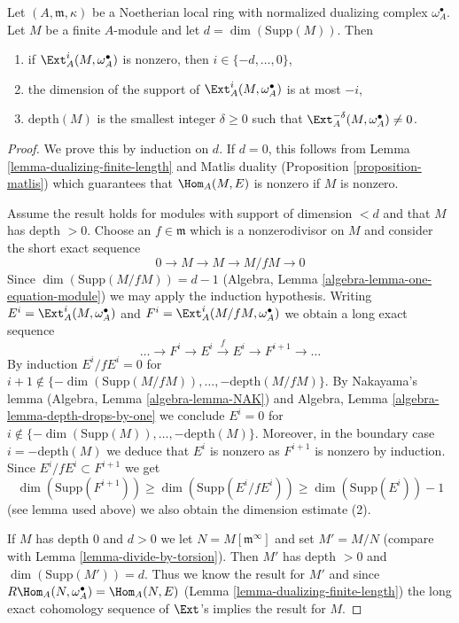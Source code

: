\begin{lemma}
\label{lemma-sitting-in-degrees}
Let $(A, \mathfrak m, \kappa)$ be a Noetherian local ring with
normalized dualizing complex $\omega_A^\bullet$. Let $M$ be a finite
$A$-module and let $d = \dim(\text{Supp}(M))$. Then
\begin{enumerate}
\item if $\Ext^i_A(M, \omega_A^\bullet)$ is nonzero, then
$i \in \{-d, \ldots, 0\}$,
\item the dimension of the support of $\Ext^i_A(M, \omega_A^\bullet)$
is at most $-i$,
\item $\text{depth}(M)$ is the smallest integer $\delta \geq 0$ such that
$\Ext^{-\delta}_A(M, \omega_A^\bullet) \not = 0$.
\end{enumerate}
\end{lemma}

\begin{proof}
We prove this by induction on $d$. If $d = 0$, this follows from
Lemma \ref{lemma-dualizing-finite-length} and Matlis duality
(Proposition \ref{proposition-matlis}) which guarantees that
$\Hom_A(M, E)$ is nonzero if $M$ is nonzero.

\medskip\noindent
Assume the result holds for modules with support of dimension $< d$ and that
$M$ has depth $> 0$. Choose an $f \in \mathfrak m$ which is a nonzerodivisor
on $M$ and consider the short exact sequence
$$
0 \to M \to M \to M/fM \to 0
$$
Since $\dim(\text{Supp}(M/fM)) = d - 1$
(Algebra, Lemma \ref{algebra-lemma-one-equation-module}) we
may apply the induction hypothesis.
Writing
$E^i = \Ext^i_A(M, \omega_A^\bullet)$ and
$F^i = \Ext^i_A(M/fM, \omega_A^\bullet)$
we obtain a long exact sequence
$$
\ldots \to F^i \to E^i \xrightarrow{f} E^i \to F^{i + 1} \to \ldots
$$
By induction $E^i/fE^i = 0$ for
$i + 1 \not \in \{-\dim(\text{Supp}(M/fM)), \ldots, -\text{depth}(M/fM)\}$.
By Nakayama's lemma (Algebra, Lemma \ref{algebra-lemma-NAK})
and Algebra, Lemma \ref{algebra-lemma-depth-drops-by-one}
we conclude $E^i = 0$ for
$i \not \in \{-\dim(\text{Supp}(M)), \ldots, -\text{depth}(M)\}$.
Moreover, in the boundary case $i = - \text{depth}(M)$ we deduce that $E^i$
is nonzero as $F^{i + 1}$ is nonzero by induction.
Since $E^i/fE^i \subset F^{i + 1}$ we get
$$
\dim(\text{Supp}(F^{i + 1})) \geq \dim(\text{Supp}(E^i/fE^i))
\geq \dim(\text{Supp}(E^i)) - 1
$$
(see lemma used above) we also obtain the dimension estimate (2).

\medskip\noindent
If $M$ has depth $0$ and $d > 0$ we let $N = M[\mathfrak m^\infty]$ and set
$M' = M/N$ (compare with Lemma \ref{lemma-divide-by-torsion}).
Then $M'$ has depth $>0$ and $\dim(\text{Supp}(M')) = d$.
Thus we know the result for $M'$ and since
$R\Hom_A(N, \omega_A^\bullet) = \Hom_A(N, E)$
(Lemma \ref{lemma-dualizing-finite-length})
the long exact cohomology sequence of $\Ext$'s implies the
result for $M$.
\end{proof}

